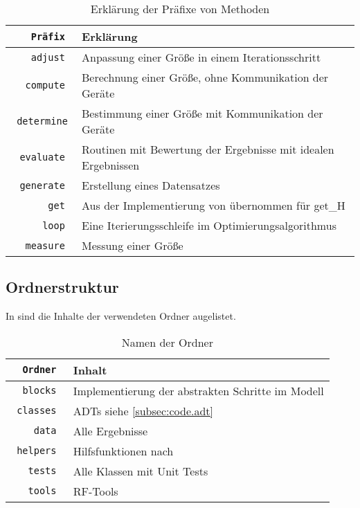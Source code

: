 \documentclass[../Report.tex]{subfiles}
\begin{document}
\begin{table}[H]
\centering 
\begin{tabular}[t]{| >{\texttt\bgroup}r<{\egroup} | l |} 
  \hline
    \textrm{Präfix} & Erklärung \\ 
  \hline \hline
    adjust & Anpassung einer Größe in einem Iterationsschritt	\\
  \hline
    compute & Berechnung einer Größe, ohne Kommunikation der Geräte \\ 
  \hline
    determine & Bestimmung einer Größe mit Kommunikation der Geräte 	\\
  \hline 
    evaluate & Routinen mit Bewertung der Ergebnisse mit idealen Ergebnissen \\  
  \hline 
    generate & Erstellung eines Datensatzes \\
  \hline
    get & Aus der Implementierung von \cite{PJS_Denys} übernommen für get\_H \\
  \hline
    loop & Eine Iterierungsschleife im Optimierungsalgorithmus \\  
  \hline  
    measure & Messung einer Größe \\  
  \hline
\end{tabular}
\caption{Erklärung der Präfixe von Methoden}
\label{tab:code.namen}
\end{table}

\subsection*{Ordnerstruktur}
\label{subsec:code.ordner}
In  sind die Inhalte der verwendeten Ordner augelistet.

\begin{table}[H]
\centering 
\begin{tabular}[t]{| >{\texttt\bgroup}r<{\egroup} | l |} 
  \hline
    \textrm{Ordner} & Inhalt \\ 
  \hline \hline
    blocks & Implementierung der abstrakten Schritte im Modell	\\
  \hline  
    classes & ADTs siehe \ref{subsec:code.adt} \\  
  \hline
    data & Alle Ergebnisse \\ 
  \hline
    helpers & Hilfsfunktionen nach \cite{helper_class} 	\\
  \hline 
    tests & Alle Klassen mit Unit Tests \\  
  \hline 
    tools & RF-Tools \\ 
  \hline
\end{tabular}
\caption{Namen der Ordner}
\label{tab:code.ordner}
\end{table}
\end{document}
